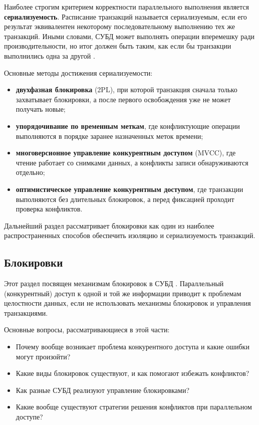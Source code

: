 Наиболее строгим критерием корректности параллельного выполнения является \textbf{сериализуемость}. Расписание транзакций называется сериализуемым, если его результат эквивалентен некоторому последовательному выполнению тех же транзакций. Иными словами, СУБД может выполнять операции вперемешку ради производительности, но итог должен быть таким, как если бы транзакции выполнились одна за другой \autocites{ElmasriNavathe}{Silberschatz}.

Основные методы достижения сериализуемости:
\begin{itemize}
    \item \textbf{двухфазная блокировка} (2PL), при которой транзакция сначала только захватывает блокировки, а после первого освобождения уже не может получать новые;
    \item \textbf{упорядочивание по временным меткам}, где конфликтующие операции выполняются в порядке заранее назначенных меток времени;
    \item \textbf{многоверсионное управление конкурентным доступом} (MVCC), где чтение работает со снимками данных, а конфликты записи обнаруживаются отдельно;
    \item \textbf{оптимистическое управление конкурентным доступом}, где транзакции выполняются без длительных блокировок, а перед фиксацией проходит проверка конфликтов.
\end{itemize}

Дальнейший раздел рассматривает блокировки как один из наиболее распространенных способов обеспечить изоляцию и сериализуемость транзакций.

\subsection{Блокировки}

Этот раздел посвящен механизмам блокировок в СУБД \autocites[c.22]{ElmasriNavathe}[c. 18]{Silberschatz}. Параллельный (конкурентный) доступ к одной и той же информации приводит к проблемам целостности данных, если не использовать механизмы блокировок и управления транзакциями.

Основные вопросы, рассматривающиеся в этой части:
\begin{itemize}
		\item Почему вообще возникает проблема конкурентного доступа и какие ошибки могут произойти?
		\item Какие виды блокировок существуют, и как помогают избежать конфликтов?
    \item Как разные СУБД реализуют управление блокировками?
    \item Какие вообще существуют стратегии решения конфликтов при параллельном доступе?
\end{itemize}

